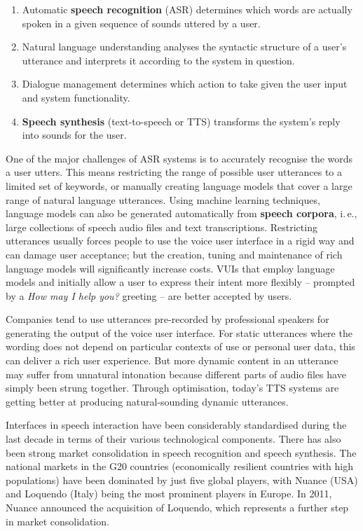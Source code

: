 \documentclass[]{../../metanetpaper}
\begin{document}
\begin{multicols}{2}
\begin{enumerate}
\item Automatic \textbf{speech recognition} (ASR) determines which words are actually spoken in a given sequence of sounds uttered by a user.  
\item Natural language understanding analyses the syntactic structure of a user’s utterance and interprets it according to the system in question.
\item Dialogue management determines which action to take given the user input and system functionality.   
\item \textbf{Speech synthesis} (text-to-speech or TTS) transforms the system’s reply into sounds for the user.
\end{enumerate}

One of the major challenges of ASR systems is to accurately recognise the words a user utters. This means restricting the range of possible user utterances to a limited set of keywords, or manually creating language models that cover a large range of natural language utterances. Using machine learning techniques, language models can also be generated automatically from \textbf{speech corpora}, i.\,e., large collections of speech audio files and text transcriptions. Restricting utterances usually forces people to use the voice user interface in a rigid way and can damage user acceptance; but the creation, tuning and maintenance of rich language models will significantly increase costs. VUIs that employ language models and initially allow a user to express their intent more flexibly -- prompted by a \textit{How may I help you?} greeting -- are better accepted by users.


Companies tend to use utterances pre-recorded by professional speakers for generating the output of the voice user interface. For static utterances where the wording does not depend on particular contexts of use or personal user data, this can deliver a rich user experience. But more dynamic content in an utterance may suffer from unnatural intonation because different parts of audio files have simply been strung together. Through optimisation, today’s TTS systems are getting better at producing natural-sounding dynamic utterances.

Interfaces in speech interaction have been considerably standardised during the last decade in terms of their various technological components. There has also been strong market consolidation in speech recognition and speech synthesis. The national markets in the G20 countries (economically resilient countries with high populations) have been dominated by just five global players, with Nuance (USA) and Loquendo (Italy) being the most prominent players in Europe. In 2011, Nuance announced the acquisition of Loquendo, which represents a further step in market consolidation.


\end{multicols}
\end{document}
